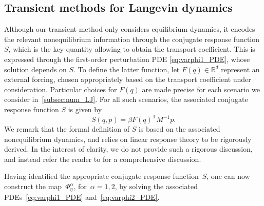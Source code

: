 \documentclass[11pt]{article}
\newcommand{\R}{\mathbb{R}}
\renewcommand{\t}{\mathsf T}
\theoremstyle{definition}
\begin{document}
\subsection{Transient methods for Langevin dynamics}
\label{subsec:num_lang}
Although our transient method only considers equilibrium dynamics, it encodes the relevant nonequilibrium information through the conjugate  response function $S$, which is the key quantity allowing to obtain the transport coefficient. This is expressed through the first-order perturbation PDE \eqref{eq:varphi1_PDE}, whose solution depends on $S$. To define the latter function, let $F(q) \in \R^{d}$ represent an external forcing, chosen appropriately based on the transport coefficient under consideration. Particular choices for $F(q)$ are made precise for each scenario we consider in~\cref{subsec:num_LJ}. For all such scenarios, the associated conjugate response function $S$ is given by
\begin{equation}
    S(q,p) = \beta F(q)^\t M^{-1} p.
    \label{eq:conj_res}
\end{equation}
We remark that the formal definition of $S$ is based on the associated nonequilibrium dynamics, and relies on linear response theory to be rigorously derived. In the interest of clarity, we do not provide such a rigorous discussion, and instead refer the reader to \cite[Section 5.2.3]{lelievre2016} for a comprehensive discussion.

Having identified the appropriate conjugate response function~$S$, one can now construct the map~$\Phi_\eta^\alpha$, for~$\alpha=1,2$, by solving the associated PDEs~\eqref{eq:varphi1_PDE} and~\eqref{eq:varphi2_PDE}. 
\end{document}
